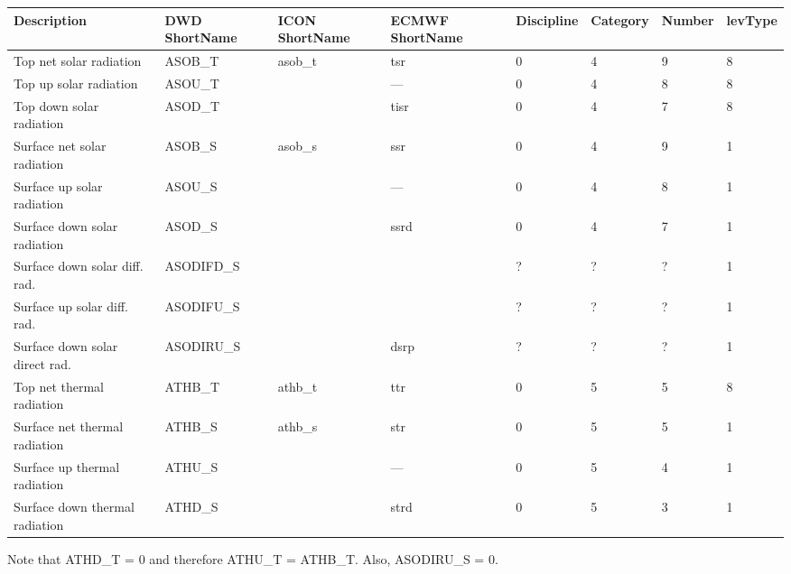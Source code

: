 \documentclass[11pt,notitlepage]{article}  %
\begin{document}
\vspace{1cm}
\hspace{-2cm}
\begin{centering}
\begin{tabular}{l p{3cm} p{3cm} p{3cm} l l l l}  

\textbf{Description}           & \textbf{DWD \linebreak ShortName} 
                               & \textbf{ICON \linebreak ShortName} 
                               & \textbf{ECMWF \linebreak ShortName} 
                               & \textbf{Discipline} & \textbf{Category} & \textbf{Number} & \textbf{levType} \\
\hline                                                                                                                                                                          

Top net solar radiation        &  ASOB\_T     &  asob\_t     &  tsr        &  0        &  4      &  9       &  8      \\
Top up solar radiation         &  ASOU\_T     &              &  ---        &  0        &  4      &  8       &  8      \\
Top down solar radiation       &  ASOD\_T     &              &  tisr       &  0        &  4      &  7       &  8      \\
Surface net solar radiation    &  ASOB\_S     &  asob\_s     &  ssr        &  0        &  4      &  9       &  1      \\
Surface up solar radiation     &  ASOU\_S     &              &  ---        &  0        &  4      &  8       &  1      \\
Surface down solar radiation   &  ASOD\_S     &              &  ssrd       &  0        &  4      &  7       &  1      \\

Surface down solar diff. rad.  &  ASODIFD\_S  &              &             &  ?        &  ?      &  ?       &  1      \\
Surface up solar diff. rad.    &  ASODIFU\_S  &              &             &  ?        &  ?      &  ?       &  1      \\
Surface down solar direct rad. &  ASODIRU\_S  &              &  dsrp       &  ?        &  ?      &  ?       &  1      \\


Top net thermal radiation      &  ATHB\_T     &  athb\_t     &  ttr        &  0        &  5      &  5       &  8      \\
Surface net thermal radiation  &  ATHB\_S     &  athb\_s     &  str        &  0        &  5      &  5       &  1      \\
Surface up thermal radiation   &  ATHU\_S     &              &  ---        &  0        &  5      &  4       &  1      \\
Surface down thermal radiation &  ATHD\_S     &              &  strd       &  0        &  5      &  3       &  1      \\

\hline
\end{tabular}
\end{centering}
\vspace{1cm}

Note that ATHD\_T = 0 and therefore ATHU\_T = ATHB\_T.  Also, ASODIRU\_S = 0.
\end{document}
